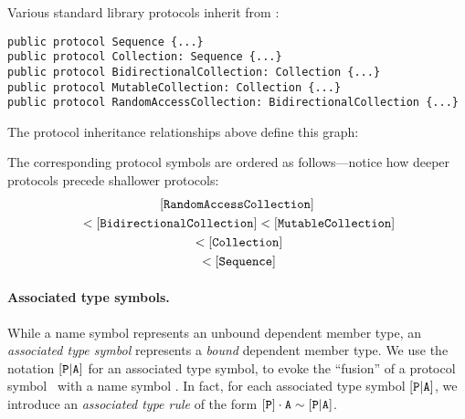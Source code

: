 \documentclass[../generics]{subfiles}
\begin{document}
\begin{example}\label{protocol reduction order example}
Various standard library protocols inherit from \tSequence:
\begin{Verbatim}
public protocol Sequence {...}
public protocol Collection: Sequence {...}
public protocol BidirectionalCollection: Collection {...}
public protocol MutableCollection: Collection {...}
public protocol RandomAccessCollection: BidirectionalCollection {...}
\end{Verbatim}
The protocol inheritance relationships above define this graph:
\begin{center}
\end{center}
The corresponding protocol symbols are ordered as follows---notice how deeper protocols precede shallower protocols:
\begin{gather*}
[\texttt{RandomAccessCollection}]\\
{} < [\texttt{BidirectionalCollection}]<[\texttt{MutableCollection}]\\
{} < [\texttt{Collection}]\\
{} < [\texttt{Sequence}]
\end{gather*}
\end{example}

\paragraph{Associated type symbols.}
While a name symbol represents an unbound dependent member type, an \emph{associated type symbol} represents a \emph{bound} dependent member type. We use the notation $[\texttt{P}|\texttt{A}]$ for an associated type symbol, to evoke the ``fusion'' of a protocol symbol \pP\ with a name symbol \nA. In fact, for each associated type symbol $[\texttt{P}|\texttt{A}]$, we introduce an \emph{associated type rule} of the form $[\texttt{P}]\cdot\texttt{A}\sim[\texttt{P}|\texttt{A}]$.
\end{document}

